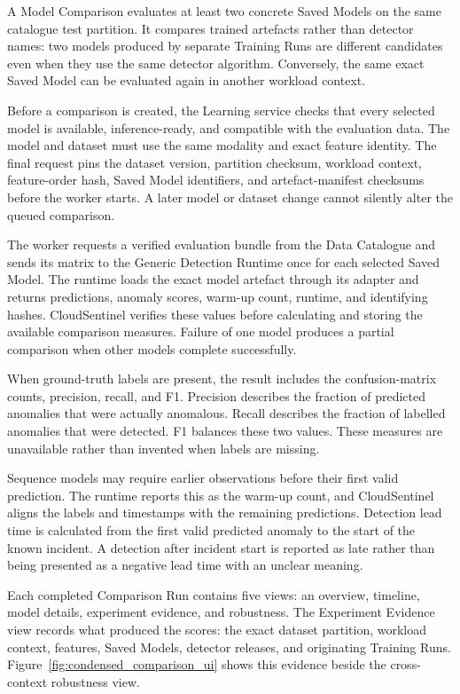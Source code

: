 A Model Comparison evaluates at least two concrete Saved Models on the same catalogue test partition. It compares trained artefacts rather than detector names: two models produced by separate Training Runs are different candidates even when they use the same detector algorithm. Conversely, the same exact Saved Model can be evaluated again in another workload context.

Before a comparison is created, the Learning service checks that every selected model is available, inference-ready, and compatible with the evaluation data. The model and dataset must use the same modality and exact feature identity. The final request pins the dataset version, partition checksum, workload context, feature-order hash, Saved Model identifiers, and artefact-manifest checksums before the worker starts. A later model or dataset change cannot silently alter the queued comparison.

The worker requests a verified evaluation bundle from the Data Catalogue and sends its matrix to the Generic Detection Runtime once for each selected Saved Model. The runtime loads the exact model artefact through its adapter and returns predictions, anomaly scores, warm-up count, runtime, and identifying hashes. CloudSentinel verifies these values before calculating and storing the available comparison measures. Failure of one model produces a partial comparison when other models complete successfully.

When ground-truth labels are present, the result includes the confusion-matrix counts, precision, recall, and F1. Precision describes the fraction of predicted anomalies that were actually anomalous. Recall describes the fraction of labelled anomalies that were detected. F1 balances these two values. These measures are unavailable rather than invented when labels are missing.

Sequence models may require earlier observations before their first valid prediction. The runtime reports this as the warm-up count, and CloudSentinel aligns the labels and timestamps with the remaining predictions. Detection lead time is calculated from the first valid predicted anomaly to the start of the known incident. A detection after incident start is reported as late rather than being presented as a negative lead time with an unclear meaning.

Each completed Comparison Run contains five views: an overview, timeline, model details, experiment evidence, and robustness. The Experiment Evidence view records what produced the scores: the exact dataset partition, workload context, features, Saved Models, detector releases, and originating Training Runs. Figure~\ref{fig:condensed_comparison_ui} shows this evidence beside the cross-context robustness view.

